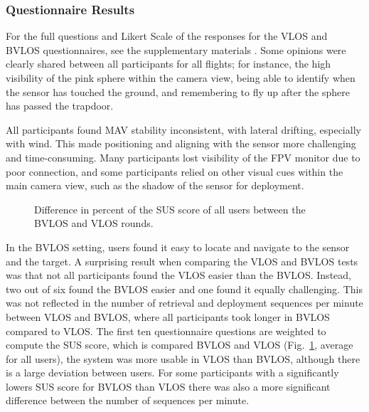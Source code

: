 \subsubsection{Questionnaire Results}
For the full questions and Likert Scale of the responses for the VLOS and BVLOS questionnaires, see the supplementary materials \cite{Geckeler}.
Some opinions were clearly shared between all participants for all flights; for instance, the high visibility of the pink sphere within the camera view, being able to identify when the sensor has touched the ground, and remembering to fly up after the sphere has passed the trapdoor. 

All participants found \gls{MAV} stability inconsistent, with lateral drifting, especially with wind. This made positioning and aligning with the sensor more challenging and time-consuming. Many participants lost visibility of the \gls{FPV} monitor due to poor connection, and some participants relied on other visual cues within the main camera view, such as the shadow of the sensor for deployment.


\begin{figure}[!t]
\centering

\caption{Difference in percent of the SUS score of all users between the \gls{BVLOS} and \gls{VLOS} rounds.}
\label{fig:fig6-bvlos-vlos}
\end{figure}

In the \gls{BVLOS} setting, users found it easy to locate and navigate to the sensor and the target. A surprising result when comparing the \gls{VLOS} and \gls{BVLOS} tests was that not all participants found the \gls{VLOS} easier than the \gls{BVLOS}. Instead, two out of six found the \gls{BVLOS} easier and one found it equally challenging. This was not reflected in the number of retrieval and deployment sequences per minute between \gls{VLOS} and \gls{BVLOS}, where all participants took longer in \gls{BVLOS} compared to \gls{VLOS}. The first ten questionnaire questions are weighted to compute the SUS score, which is compared \gls{BVLOS} and \gls{VLOS} (Fig.~\ref{fig:fig6-bvlos-vlos}, average for all users), the system was more usable in \gls{VLOS} than \gls{BVLOS}, although there is a large deviation between users. For some participants with a significantly lowers SUS score for \gls{BVLOS} than \gls{VLOS} there was also a more significant difference between the number of sequences per minute.

